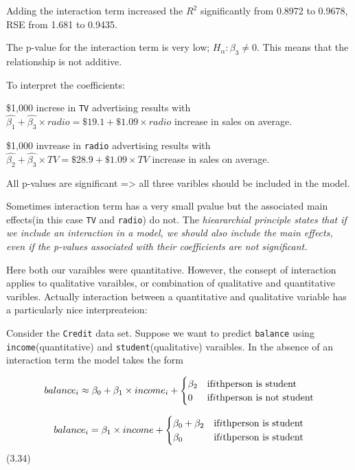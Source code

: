 \documentclass[
  letterpaper,
  DIV=11,
  numbers=noendperiod]{scrreprt}
\begin{document}
Adding the interaction term increased the \(R^2\) significantly from
0.8972 to 0.9678, RSE from 1.681 to 0.9435.

The p-value for the interaction term is very low;
\(H_\alpha : \beta_3 \neq 0\). This means that the relationship is not
additive.

To interpret the coefficients:

\$1,000 increse in \texttt{TV} advertising results with
\(\hat{\beta_1} +\hat{\beta_3}\times radio = \$19.1 + \$1.09 \times radio\)
increase in sales on average.

\$1,000 invrease in \texttt{radio} advertising results with
\(\hat{\beta_2} + \hat{\beta_3} \times TV = \$28.9 + \$1.09 \times TV\)
increase in sales on average.

All p-values are significant =\textgreater{} all three varibles should
be included in the model.

Sometimes interaction term has a very small pvalue but the associated
main effects(in this case \texttt{TV} and \texttt{radio}) do not. The
\emph{hieararchial principle states that if we include an interaction in
a model, we should also include the main effects, even if the p-values
associated with their coefficients are not significant.}

Here both our varaibles were quantitative. However, the consept of
interaction applies to qualitative varaibles, or combination of
qualitative and quantitative varibles. Actually interaction between a
quantitative and qualitative variable has a particularly nice
interpreateion:

Consider the \texttt{Credit} data set. Suppose we want to predict
\texttt{balance} using \texttt{income}(quantitative) and
\texttt{student}(qualitative) varaibles. In the absence of an
interaction term the model takes the form

\[
balance_i  \approx \beta_0 + \beta_1 \times income_i + 
\begin{cases}
\beta_2 & \text{if} \space i\text{th} \space \text{person is student} \\
0 & \text{if} \space i\text{th} \space \text{person is not student}
\end{cases}
\]

\[
balance_i = \beta_1 \times income + 
\begin{cases}
\beta_0 + \beta_2 & \text{if} \space i\text{th} \space \text{person is student} \\
\beta_0 &\text{if} \space i\text{th} \space \text{person is student}
\end{cases}
\] (3.34)
\end{document}
